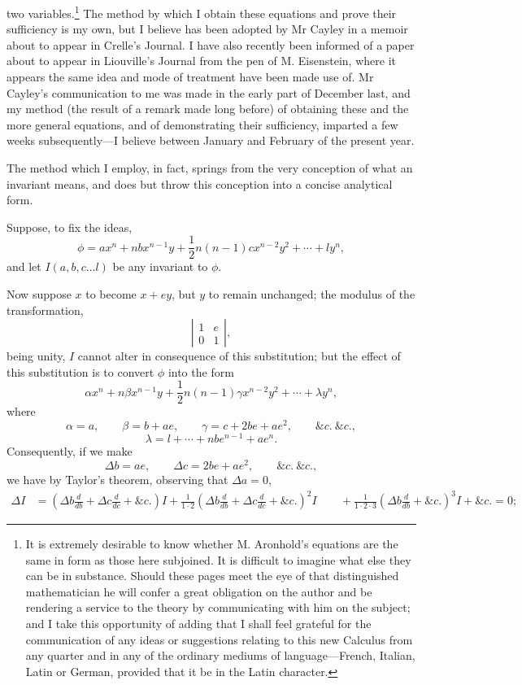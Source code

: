 \documentclass[11pt]{article}
\newcommand{\sourcepage}[1]{\marginpar{\scriptsize p.~#1}}
\begin{document}
{{\sourcepage{352}
two variables.\footnote{It is extremely desirable to know whether M. Aronhold's equations are the same in form as those here subjoined. It is difficult to imagine what else they can be in substance. Should these pages meet the eye of that distinguished mathematician he will confer a great obligation on the author and be rendering a service to the theory by communicating with him on the subject; and I take this opportunity of adding that I shall feel grateful for the communication of any ideas or suggestions relating to this new Calculus from any quarter and in any of the ordinary mediums of language---French, Italian, Latin or German, provided that it be in the Latin character.} The method by which I obtain these equations and prove their sufficiency is my own, but I believe has been adopted by Mr Cayley in a memoir about to appear in Crelle's Journal. I have also recently been informed of a paper about to appear in Liouville's Journal from the pen of M. Eisenstein, where it appears the same idea and mode of treatment have been made use of. Mr Cayley's communication to me was made in the early part of December last, and my method (the result of a remark made long before) of obtaining these and the more general equations, and of demonstrating their sufficiency, imparted a few weeks subsequently---I believe between January and February of the present year.

The method which I employ, in fact, springs from the very conception of what an invariant means, and does but throw this conception into a concise analytical form.

Suppose, to fix the ideas,
\[
\phi=ax^n+nbx^{n-1}y+\frac12n(n-1)cx^{n-2}y^2+\cdots+ly^n,
\]
and let $I(a,b,c\ldots l)$ be any invariant to $\phi$.

Now suppose $x$ to become $x+ey$, but $y$ to remain unchanged; the modulus of the transformation,
\[
\left|\begin{array}{cc}1&e\\0&1\end{array}\right|,
\]
being unity, $I$ cannot alter in consequence of this substitution; but the effect of this substitution is to convert $\phi$ into the form
\[
\alpha x^n+n\beta x^{n-1}y+\frac12n(n-1)\gamma x^{n-2}y^2+\cdots+\lambda y^n,
\]
where
\[
\alpha=a,
\qquad \beta=b+ae,
\qquad \gamma=c+2be+ae^2,
\qquad \&c.\ \&c.,
\]
\[
\lambda=l+\cdots+nbe^{n-1}+ae^n.
\]
Consequently, if we make
\[
\Delta b=ae,
\qquad \Delta c=2be+ae^2,
\qquad \&c.\ \&c.,
\]
we have by Taylor's theorem, observing that $\Delta a=0$,
\[
\begin{aligned}
\Delta I&=\left(\Delta b\frac{d}{db}+\Delta c\frac{d}{dc}+\&c.\right)I
+\frac1{1\cdot2}\left(\Delta b\frac{d}{db}+\Delta c\frac{d}{dc}+\&c.\right)^2I\
&\quad+\frac1{1\cdot2\cdot3}\left(\Delta b\frac{d}{db}+\&c.\right)^3I+\&c.=0;
\end{aligned}
\]

}}
\end{document}
